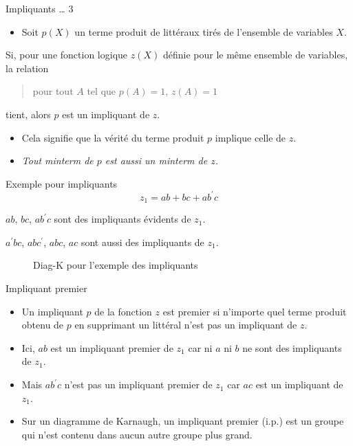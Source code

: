 \documentclass[presentation]{beamer}
\begin{document}
\begin{frame}[label={sec:orge45e84f}]{Impliquants \ldots{} 3}
\begin{itemize}
\item Soit \(p(X)\) un terme produit de littéraux tirés de l'ensemble de variables \(X\).
\end{itemize}

Si, pour une fonction logique \(z(X)\) définie pour le même ensemble de variables, la relation
\begin{quote}
\alert{pour tout \(A\) tel que \(p(A)=1\), \(z(A)=1\)}
\end{quote}
tient, alors \(p\) est un \alert{impliquant} de \(z\). 

\begin{itemize}
\item Cela signifie que la vérité du terme produit \(p\) implique celle de \(z\).

\item \emph{Tout minterm de \(p\) est aussi un minterm de \(z\).}
\end{itemize}
\end{frame}

\begin{frame}[label={sec:orgf8fd9af}]{Exemple pour impliquants}
$$z_1 = ab + bc + a b^{\prime} c$$ 

\(a b\), \(b c\), \(a b^{\prime} c\) sont des impliquants évidents de \(z_1\).

\(a^{\prime} b c\), \(a b c^{\prime}\), \(a b c\), \(a c\) sont aussi des
impliquants de \(z_1\).

\begin{figure}[htbp]
\centering

\caption{\label{fig:orgbdf6932}Diag-K pour l'exemple des impliquants}
\end{figure}
\end{frame}

\begin{frame}[label={sec:org02c6aac}]{Impliquant premier}
\begin{itemize}
\item Un impliquant \(p\) de la fonction \(z\) est \alert{premier} si n'importe quel terme produit obtenu de \(p\) en supprimant un littéral n'est pas un impliquant de \(z\).

\item Ici, \(a b\) est un impliquant premier de \(z_1\) car ni \(a\) ni \(b\) ne sont des impliquants de \(z_1\).

\item Mais \(a b^{\prime} c\) n'est pas un impliquant premier de \(z_1\) car \(a c\) est un impliquant de \(z_1\).

\item Sur un diagramme de Karnaugh, un impliquant premier (i.p.) est un groupe qui n'est contenu dans aucun autre groupe plus grand.
\end{itemize}
\end{frame}
\end{document}
